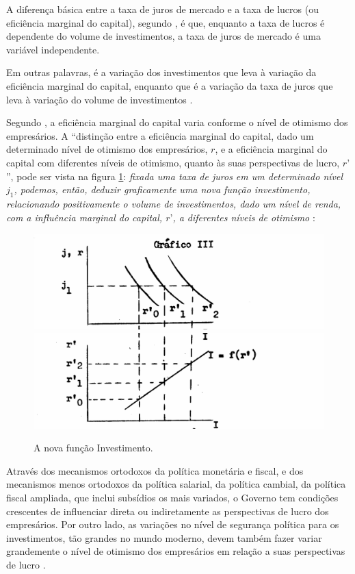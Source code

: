 \documentclass[
	12pt,				%
	oneside,			%
	a4paper,			%
	chapter=TITLE,		%
	section=TITLE,		%
	english,			%
	brazil				%
	]{abntex2}
\begin{document}
A diferença básica entre a taxa de juros de mercado e a taxa de lucros
(ou eficiência marginal do capital), segundo
\textcite{Bresser-Pereira1973}, é que, enquanto a taxa de lucros é
dependente do volume de investimentos, a taxa de juros de mercado é uma
variável independente.
\begin{citacao}
Em outras palavras, é a variação dos investimentos que leva à variação da
eficiência marginal do capital, enquanto que é a variação da taxa de juros que
leva à variação do volume de investimentos
\cite{Bresser-Pereira1973}.
\end{citacao}
Segundo \textcite{Bresser-Pereira1973}, a eficiência marginal do capital
varia conforme o nível de otimismo dos empresários. A ``distinção entre
a eficiência marginal do capital, dado um determinado nível de otimismo
dos empresários, \(r\), e a eficiência marginal do capital com
diferentes níveis de otimismo, quanto às suas perspectivas de lucro,
\(r’\)'', pode ser vista na figura \ref{fig:eficienciamarginal2}:
\textit{fixada uma taxa de juros em um
determinado nível $j_1$, podemos, então, deduzir graficamente uma nova função
investimento, relacionando positivamente o volume de investimentos, dado um
nível de renda, com a influência marginal do capital, $r’$, a diferentes níveis de
otimismo} \cite[p.~8]{Bresser-Pereira1973}:
\begin{figure}[h]
\begin{center}
\includegraphics[width=.8\textwidth]{images/Page-8-Image-3.png}
\includegraphics[width=.8\textwidth]{images/Page-8-Image-4.png}
\end{center}
\caption{A nova função Investimento.}
\label{fig:eficienciamarginal2}
\end{figure}
\begin{citacao}
Através dos mecanismos ortodoxos da política monetária e fiscal, e dos
mecanismos menos ortodoxos da política salarial, da política cambial, da
política fiscal ampliada, que inclui subsídios os mais variados, o Governo tem
condições crescentes de influenciar direta ou indiretamente as perspectivas de
lucro dos empresários. Por outro lado, as variações no nível de segurança
política para os investimentos, tão grandes no mundo moderno, devem também fazer
variar grandemente o nível de otimismo dos empresários em relação a suas
perspectivas de lucro
\cite[p.~9]{Bresser-Pereira1973}.
\end{citacao}
\end{document}
